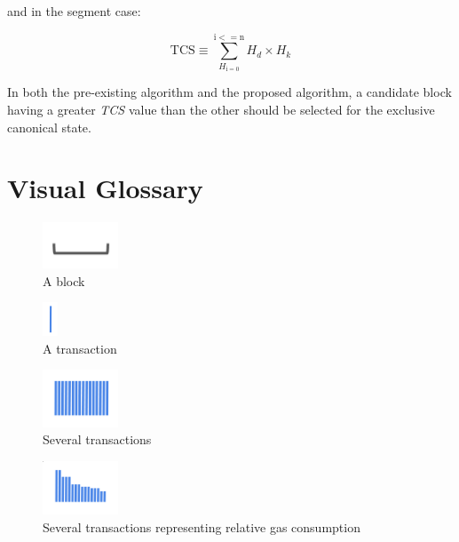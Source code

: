 \documentclass[11pt]{article}
\theoremstyle{plain}
\begin{document}
and in the segment case:

\begin{equation}
\mathrm{TCS} \equiv \sum_{H_\mathrm{i = 0}}^{\mathrm{i <= n}} H_d \times H_k
\end{equation}

In both the pre-existing algorithm and the proposed algorithm, a candidate
block having a greater \textit{TCS} value than the other should be selected for
the exclusive canonical state.


\pagebreak
\section{\normalsize{Visual Glossary}}

\begin{figure}[tph]
\centering
\includegraphics[width=0.2\textwidth]{vis_block.png}
\caption{A block}
\label{fig:block}
\end{figure}

\begin{figure}[tph]
\centering
\includegraphics[height=1cm]{vis_tx.png}
\caption{A transaction}
\label{fig:tx}
\end{figure}

\begin{figure}[tph]
\centering
\includegraphics[width=0.2\textwidth]{vis_tx_set.png}
\caption{Several transactions}
\label{fig:txs}
\end{figure}

\begin{figure}[tph]
\centering
\includegraphics[width=0.2\textwidth]{vis_tx_set_sized.png}
\caption{Several transactions representing relative gas consumption}
\label{fig:txsgas}
\end{figure}
\end{document}
